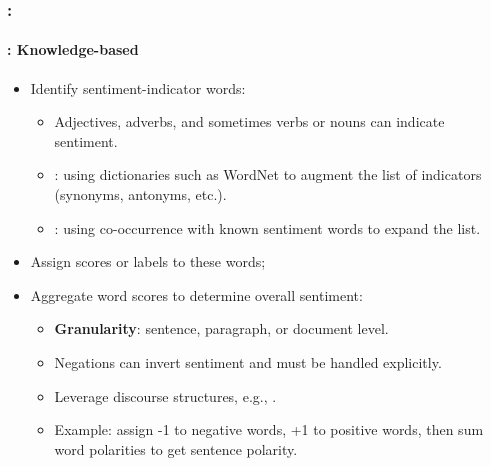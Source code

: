 \documentclass[xcolor=table]{beamer}
\begin{document}
\begin{frame}
	\frametitle{\insertshortsubtitle: \insertsection}
	\framesubtitle{\insertsubsection: Knowledge-based}
	
	\begin{itemize}
		\item Identify sentiment-indicator words:
		\begin{itemize}
			\item Adjectives, adverbs, and sometimes verbs or nouns can indicate sentiment.
			\item {}: using dictionaries such as WordNet to augment the list of indicators (synonyms, antonyms, etc.).
			\item {}: using co-occurrence with known sentiment words to expand the list.
		\end{itemize}
		\item Assign scores or labels to these words;
		\item Aggregate word scores to determine overall sentiment:
		\begin{itemize}
			\item \textbf{Granularity}: sentence, paragraph, or document level.
			\item Negations can invert sentiment and must be handled explicitly.
			\item Leverage discourse structures, e.g., .
			\item Example: assign -1 to negative words, +1 to positive words, then sum word polarities to get sentence polarity.
		\end{itemize}
	\end{itemize}
	
\end{frame}
\end{document}
